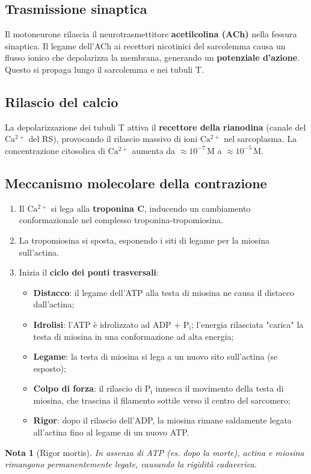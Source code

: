 \documentclass[12pt,a4paper]{report}
\newtheorem{nota}{Nota}[section]
\begin{document}
\subsection{Trasmissione sinaptica}
Il motoneurone rilascia il neurotrasmettitore \textbf{acetilcolina (ACh)} nella fessura sinaptica. Il legame dell'ACh ai recettori nicotinici del sarcolemma causa un flusso ionico che depolarizza la membrana, generando un \textbf{potenziale d'azione}. Questo si propaga lungo il sarcolemma e nei tubuli T.
\subsection{Rilascio del calcio}
La depolarizzazione dei tubuli T attiva il \textbf{recettore della rianodina} (canale del \(\mathrm{Ca^{2+}}\) del RS), provocando il rilascio massivo di ioni \(\mathrm{Ca^{2+}}\) nel sarcoplasma. La concentrazione citosolica di \(\mathrm{Ca^{2+}}\) aumenta da \(\approx 10^{-7}\,\mathrm{M}\) a \(\approx 10^{-5}\,\mathrm{M}\).
\subsection{Meccanismo molecolare della contrazione}
\begin{enumerate}
\item Il \(\mathrm{Ca^{2+}}\) si lega alla \textbf{troponina C}, inducendo un cambiamento conformazionale nel complesso troponina-tropomiosina.
\item La tropomiosina si sposta, esponendo i siti di legame per la miosina sull'actina.
\item Inizia il \textbf{ciclo dei ponti trasversali}:
\begin{itemize}
    \item \textbf{Distacco}: il legame dell'ATP alla testa di miosina ne causa il distacco dall'actina;
    \item \textbf{Idrolisi}: l'ATP è idrolizzato ad ADP + \(\mathrm{P_i}\); l'energia rilasciata "carica" la testa di miosina in una conformazione ad alta energia;
    \item \textbf{Legame}: la testa di miosina si lega a un nuovo sito sull'actina (se esposto);
    \item \textbf{Colpo di forza}: il rilascio di \(\mathrm{P_i}\) innesca il movimento della testa di miosina, che trascina il filamento sottile verso il centro del sarcomero;
    \item \textbf{Rigor}: dopo il rilascio dell'ADP, la miosina rimane saldamente legata all'actina fino al legame di un nuovo ATP.
\end{itemize}
\end{enumerate}
\begin{nota}[Rigor mortis]
In assenza di ATP (es. dopo la morte), actina e miosina rimangono permanentemente legate, causando la rigidità cadaverica.
\end{nota}
\end{document}
